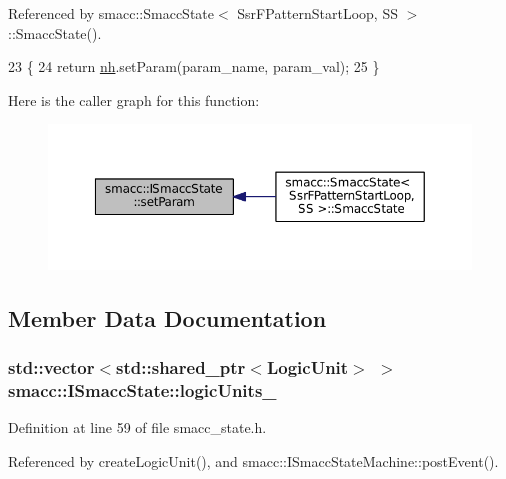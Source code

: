 Referenced by smacc\+::\+Smacc\+State$<$ Ssr\+F\+Pattern\+Start\+Loop, S\+S $>$\+::\+Smacc\+State().


\begin{DoxyCode}
23 \{
24     \textcolor{keywordflow}{return} \hyperlink{classsmacc_1_1ISmaccState_a13fe6e6abfdb87996402189d44b78494}{nh}.setParam(param\_name, param\_val);
25 \}
\end{DoxyCode}


Here is the caller graph for this function\+:
\nopagebreak
\begin{figure}[H]
\begin{center}
\leavevmode
\includegraphics[width=350pt]{classsmacc_1_1ISmaccState_a0b6c531ca8c446052022308548f55b92_icgraph}
\end{center}
\end{figure}




\subsection{Member Data Documentation}
\subsubsection[{\texorpdfstring{logic\+Units\+\_\+}{logicUnits_}}]{\setlength{\rightskip}{0pt plus 5cm}std\+::vector$<$std\+::shared\+\_\+ptr$<${\bf Logic\+Unit}$>$ $>$ smacc\+::\+I\+Smacc\+State\+::logic\+Units\+\_\+}\hypertarget{classsmacc_1_1ISmaccState_a21bb2f9adba9c86e3d5306fd1db99fcd}{}\label{classsmacc_1_1ISmaccState_a21bb2f9adba9c86e3d5306fd1db99fcd}


Definition at line 59 of file smacc\+\_\+state.\+h.



Referenced by create\+Logic\+Unit(), and smacc\+::\+I\+Smacc\+State\+Machine\+::post\+Event().

